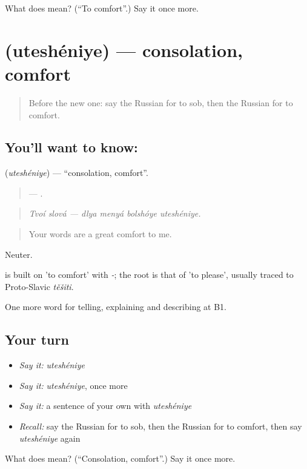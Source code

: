 \begin{tcolorbox}[breakable,colback=teal!4,colframe=teal!35!black,title={Before you move on}]
What does  mean? (\textquotedblleft{}To comfort\textquotedblright{}.) Say it once more.
\end{tcolorbox}
\section[\texorpdfstring{\ru{утешение} (uteshéniye)}{утешение (uteshéniye)}]{ (uteshéniye) — consolation, comfort}

\label{lesson:RU-C480-utesheniye}



\begin{quote}
Before the new one: say the Russian for to sob, then the Russian for to comfort.
\end{quote}

\subsection*{You'll want to know: }
\textbf{} (\emph{uteshéniye}) — \textquotedblleft{}consolation, comfort\textquotedblright{}.

\begin{quote}
  —    .
\end{quote}

\begin{quote}
\emph{Tvoí slová — dlya menyá bolshóye uteshéniye.}
\end{quote}

\begin{quote}
Your words are a great comfort to me.
\end{quote}

Neuter.

\begin{cousinweb}
\emph{} is built on \emph{} 'to comfort' with \emph{-}; the root is that of \emph{} 'to please', usually traced to Proto-Slavic \emph{těšiti}.
\end{cousinweb}

\begin{grammarlens}[title={What you've built}]
One more word for telling, explaining and describing at B1.
\end{grammarlens}

\subsection*{Your turn}
\begin{itemize}
\raggedright
  \item \emph{Say it:} \emph{uteshéniye}
  \item \emph{Say it:} \emph{uteshéniye}, once more
  \item \emph{Say it:} a sentence of your own with \emph{uteshéniye}
  \item \emph{Recall:} say the Russian for to sob, then the Russian for to comfort, then say \emph{uteshéniye} again
\end{itemize}

\begin{tcolorbox}[breakable,colback=teal!4,colframe=teal!35!black,title={Before you move on}]
What does  mean? (\textquotedblleft{}Consolation, comfort\textquotedblright{}.) Say it once more.
\end{tcolorbox}
